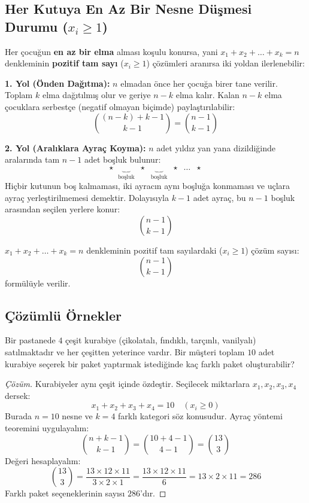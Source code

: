 \subsection{Her Kutuya En Az Bir Nesne Düşmesi Durumu (\texorpdfstring{$x_i \ge 1$}{x\_i >= 1})}

Her çocuğun \textbf{en az bir elma} alması koşulu konursa, yani $x_1 + x_2 + \dots + x_k = n$ denkleminin \textbf{pozitif tam sayı} ($x_i \ge 1$) çözümleri aranırsa iki yoldan ilerlenebilir:

\textbf{1. Yol (Önden Dağıtma):}
$n$ elmadan önce her çocuğa birer tane verilir. Toplam $k$ elma dağıtılmış olur ve geriye $n - k$ elma kalır. Kalan $n - k$ elma çocuklara serbestçe (negatif olmayan biçimde) paylaştırılabilir:
\[ \binom{(n - k) + k - 1}{k - 1} = \binom{n - 1}{k - 1} \]

\textbf{2. Yol (Aralıklara Ayraç Koyma):}
$n$ adet yıldız yan yana dizildiğinde aralarında tam $n - 1$ adet boşluk bulunur:
\[ \star \;\; \underbrace{\quad}_{\text{boşluk}} \;\; \star \;\; \underbrace{\quad}_{\text{boşluk}} \;\; \star \;\; \dots \;\; \star \]
Hiçbir kutunun boş kalmaması, iki ayracın aynı boşluğa konmaması ve uçlara ayraç yerleştirilmemesi demektir. Dolayısıyla $k - 1$ adet ayraç, bu $n - 1$ boşluk arasından seçilen yerlere konur:
\[ \binom{n - 1}{k - 1} \]

\begin{theorem}
$x_1 + x_2 + \dots + x_k = n$ denkleminin pozitif tam sayılardaki ($x_i \ge 1$) çözüm sayısı:
\[ \binom{n - 1}{k - 1} \]
formülüyle verilir.
\end{theorem}

\subsection{Çözümlü Örnekler}

\begin{example}
Bir pastanede $4$ çeşit kurabiye (çikolatalı, fındıklı, tarçınlı, vanilyalı) satılmaktadır ve her çeşitten yeterince vardır. Bir müşteri toplam $10$ adet kurabiye seçerek bir paket yaptırmak istediğinde kaç farklı paket oluşturabilir?
\end{example}
\begin{proof}[Çözüm]
Kurabiyeler aynı çeşit içinde özdeştir. Seçilecek miktarlara $x_1, x_2, x_3, x_4$ dersek:
\[ x_1 + x_2 + x_3 + x_4 = 10 \quad (x_i \ge 0) \]
Burada $n = 10$ nesne ve $k = 4$ farklı kategori söz konusudur.
Ayraç yöntemi teoremini uygulayalım:
\[ \binom{n + k - 1}{k - 1} = \binom{10 + 4 - 1}{4 - 1} = \binom{13}{3} \]
Değeri hesaplayalım:
\[ \binom{13}{3} = \frac{13 \times 12 \times 11}{3 \times 2 \times 1} = \frac{13 \times 12 \times 11}{6} = 13 \times 2 \times 11 = 286 \]
Farklı paket seçeneklerinin sayısı $286$'dır.
\end{proof}

